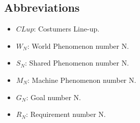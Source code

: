 \subsection{Abbreviations}

\begin{itemize}
	\item $CLup$: Costumers Line-up. 
	\item $W_N$: World Phenomenon number N.
	\item $S_N$: Shared Phenomenon number N.
	\item $M_N$: Machine Phenomenon number N.
	\item $G_N$: Goal number N.
	\item $R_N$: Requirement number N.
\end{itemize}
 
 